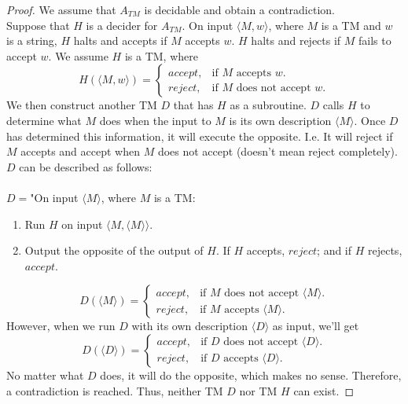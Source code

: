 \documentclass[11pt]{article}
\theoremstyle{definition}
\begin{document}
\begin{proof}
We assume that $A_{TM}$ is decidable and obtain a contradiction.\\
Suppose that $H$ is a decider for $A_{TM}$. On input $\langle M,w\rangle$, where $M$ is a TM and $w$ is a string, $H$ halts and accepts if $M$ accepts $w$. $H$ halts and rejects if $M$ fails to accept $w$. We assume $H$ is a TM, where
\begin{equation}
  H(\langle M,w\rangle)=\begin{cases}
    accept, & \text{if $M$ accepts $w$}.\\
    reject, & \text{if $M$ does not accept $w$}.
  \end{cases}
\end{equation}
We then construct another TM $D$ that has $H$ as a subroutine. $D$ calls $H$ to determine what $M$ does when the input to $M$ is its own description $\langle M \rangle$. Once $D$ has determined this information, it will execute the opposite. I.e. It will reject if $M$ accepts and accept when $M$ does not accept (doesn't mean reject completely). $D$ can be described as follows:\\\\
$D = $"On input $\langle M \rangle$, where $M$ is a TM:\\
\begin{enumerate}
    \item Run $H$ on input $\langle M,\langle M \rangle\rangle$.
    \item Output the opposite of the output of $H$. If $H$ accepts, $reject$; and if $H$ rejects, $accept$.
\end{enumerate}
\begin{equation}
  D(\langle M\rangle)=\begin{cases}
    accept, & \text{if $M$ does not accept $\langle M\rangle$}.\\
    reject, & \text{if $M$ accepts $\langle M\rangle$}.
  \end{cases}
\end{equation}
However, when we run $D$ with its own description $\langle D\rangle$ as input, we'll get \begin{equation}
  D(\langle D\rangle)=\begin{cases}
    accept, & \text{if $D$ does not accept $\langle D\rangle$}.\\
    reject, & \text{if $D$ accepts $\langle D\rangle$}.
  \end{cases}
\end{equation}
No matter what $D$ does, it will do the opposite, which makes no sense. Therefore, a contradiction is reached. Thus, neither TM $D$ nor TM $H$ can exist. 
\end{proof}
\end{document}
